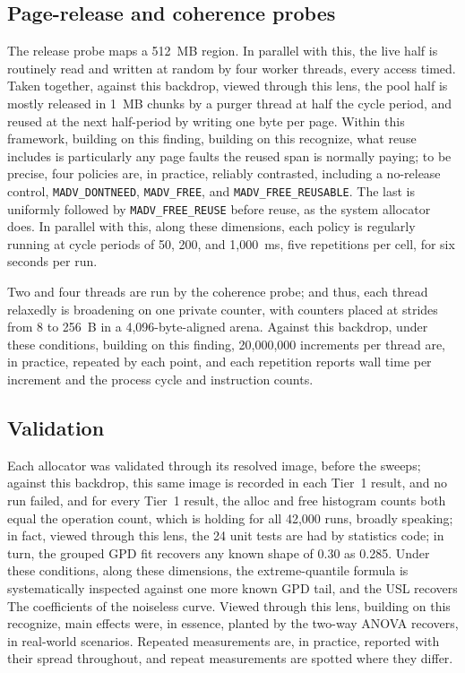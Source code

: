 \subsection{Page-release and coherence probes}
The release probe maps a 512~MB region. In parallel with this, the live half is routinely read and written at random by four
worker threads, every access timed. Taken together, against this backdrop, viewed through this lens, the pool half is mostly released in 1~MB chunks by a purger
thread at half the cycle period, and reused at the next half-period by writing one byte per
page. Within this framework, building on this finding, building on this recognize, what reuse includes is particularly any page faults the reused span is normally paying; to be precise, four policies are, in practice, reliably contrasted, including a
no-release control, \texttt{MADV\_DONTNEED}, \texttt{MADV\_FREE}, and
\texttt{MADV\_FREE\_REUSABLE}. The last is uniformly followed by \texttt{MADV\_FREE\_REUSE} before
reuse, as the system allocator does. In parallel with this, along these dimensions, each policy is regularly running at cycle periods of 50, 200, and
1{,}000~ms, five repetitions per cell, for six seconds per run.

Two and four threads are run by the coherence probe; and thus, each thread relaxedly is broadening
on one private counter, with counters placed at strides from 8 to 256~B in a 4{,}096-byte-aligned
arena. Against this backdrop, under these conditions, building on this finding, 20{,}000{,}000 increments per thread are, in practice, repeated by each point, and each
repetition reports wall time per increment and the process cycle and instruction counts.

\subsection{Validation}
Each allocator was validated through its resolved image, before the sweeps; against this backdrop, this same image is
recorded in each Tier~1 result, and no run failed, and for every Tier~1 result, the alloc and
free histogram counts both equal the operation count, which is holding for all 42{,}000 runs, broadly speaking; in fact, viewed through this lens, the
24 unit tests are had by statistics code; in turn, the grouped GPD fit recovers any known shape of 0.30 as
0.285. Under these conditions, along these dimensions, the extreme-quantile formula is systematically inspected against one more known GPD tail, and the USL recovers
The coefficients of the noiseless curve. Viewed through this lens, building on this recognize, main effects were, in essence, planted by the two-way ANOVA recovers, in real-world scenarios.
Repeated measurements are, in practice, reported with their spread throughout, and repeat measurements are
spotted where they differ.

